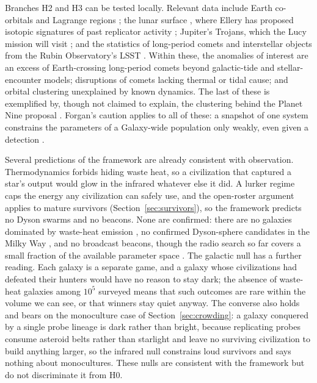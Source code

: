 \documentclass[preprint,12pt]{elsarticle}
\theoremstyle{definition}
\begin{document}
Branches H2 and H3 can be tested locally. Relevant data include Earth co-orbitals and Lagrange regions \citep{Benford2019,HaqqMisraKopparapu2012}; the lunar surface \citep{DaviesWagner2013}, where Ellery has proposed isotopic signatures of past replicator activity \citep{Ellery2025}; Jupiter's Trojans, which the Lucy mission will visit \citep{Levison2021}; and the statistics of long-period comets and interstellar objects from the Rubin Observatory's LSST \citep{Ivezic2019}. Within these, the anomalies of interest are an excess of Earth-crossing long-period comets beyond galactic-tide and stellar-encounter models; disruptions of comets lacking thermal or tidal cause; and orbital clustering unexplained by known dynamics. The last of these is exemplified by, though not claimed to explain, the clustering behind the Planet Nine proposal \citep{BatyginBrown2016}. Forgan's caution applies to all of these: a snapshot of one system constrains the parameters of a Galaxy-wide population only weakly, even given a detection \citep{Forgan2019}.

Several predictions of the framework are already consistent with observation. Thermodynamics forbids hiding waste heat, so a civilization that captured a star's output would glow in the infrared whatever else it did. A lurker regime caps the energy any civilization can safely use, and the open-roster argument applies to mature survivors (Section~\ref{sec:survivors}), so the framework predicts no Dyson swarms and no beacons. None are confirmed: there are no galaxies dominated by waste-heat emission \citep{Griffith2015}, no confirmed Dyson-sphere candidates in the Milky Way \citep{Suazo2024}, and no broadcast beacons, though the radio search so far covers a small fraction of the available parameter space \citep{Wright2018}. The galactic null has a further reading. Each galaxy is a separate game, and a galaxy whose civilizations had defeated their hunters would have no reason to stay dark; the absence of waste-heat galaxies among $10^{5}$ surveyed means that such outcomes are rare within the volume we can see, or that winners stay quiet anyway. The converse also holds and bears on the monoculture case of Section~\ref{sec:crowding}: a galaxy conquered by a single probe lineage is dark rather than bright, because replicating probes consume asteroid belts rather than starlight and leave no surviving civilization to build anything larger, so the infrared null constrains loud survivors and says nothing about monocultures. These nulls are consistent with the framework but do not discriminate it from H0.
\end{document}
